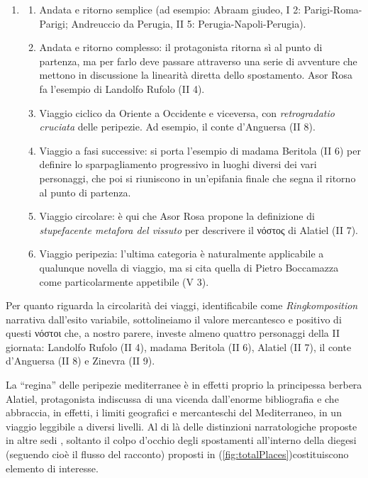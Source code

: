 \begin{enumerate}
\def\labelenumi{(\arabic{enumi})}
\item
  \begin{enumerate}
  \def\labelenumii{(\roman{enumii})}
  \tightlist
  \item
    Andata e ritorno semplice (ad esempio: Abraam giudeo, I 2:
    Parigi-Roma-Parigi; Andreuccio da Perugia, II 5:
    Perugia-Napoli-Perugia).
  \item
    Andata e ritorno complesso: il protagonista ritorna sì al punto di
    partenza, ma per farlo deve passare attraverso una serie di
    avventure che mettono in discussione la linearità diretta dello
    spostamento. Asor Rosa fa l'esempio di Landolfo Rufolo (II 4).
  \item
    Viaggio ciclico da Oriente a Occidente e viceversa, con
    \emph{retrogradatio cruciata} delle peripezie. Ad esempio, il conte
    d'Anguersa (II 8).
  \item
    Viaggio a fasi successive: si porta l'esempio di madama Beritola (II
    6) per definire lo sparpagliamento progressivo in luoghi diversi dei
    vari personaggi, che poi si riuniscono in un'epifania finale che
    segna il ritorno al punto di partenza.
  \item
    Viaggio circolare: è qui che Asor Rosa propone la definizione di
    \emph{stupefacente metafora del vissuto} per descrivere il νόστος di
    Alatiel (II 7).
  \item
    Viaggio peripezia: l'ultima categoria è naturalmente applicabile a
    qualunque novella di viaggio, ma si cita quella di Pietro Boccamazza
    come particolarmente appetibile (V 3).
  \end{enumerate}
\end{enumerate}

Per quanto riguarda la circolarità dei viaggi, identificabile come
\emph{Ringkomposition} narrativa dall'esito variabile, sottolineiamo il
valore mercantesco e positivo di questi νόστοι che, a nostro parere,
investe almeno quattro personaggi della II giornata: Landolfo Rufolo (II
4), madama Beritola (II 6), Alatiel (II 7), il conte d'Anguersa (II 8) e
Zinevra (II 9).

La ``regina'' delle peripezie mediterranee è in effetti proprio la
principessa berbera Alatiel, protagonista indiscussa di una vicenda
dall'enorme bibliografia e che abbraccia, in effetti, i limiti
geografici e mercanteschi del Mediterraneo, in un viaggio leggibile a
diversi livelli. Al di là delle distinzioni narratologiche proposte in
altre sedi \autocite{bolpagni2016}, soltanto il colpo d'occhio degli
spostamenti all'interno della diegesi (seguendo cioè il flusso del
racconto) proposti in (\ref{fig:totalPlaces})costituiscono elemento di
interesse.

